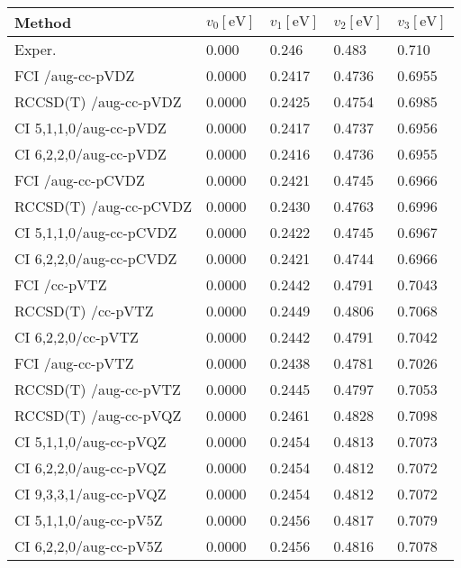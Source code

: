 \begin{tabular}{lllll}
\toprule
Method & $v_0 [\mathrm{eV}]$ & $v_1 [\mathrm{eV}]$ & $v_2 [\mathrm{eV}]$ & $v_3[\mathrm{eV}]$ \\ \midrule
    Exper. & 0.000 & 0.246 & 0.483 & 0.710 \\
\midrule
FCI /aug-cc-pVDZ & 0.0000 & 0.2417 & 0.4736 & 0.6955\\
RCCSD(T) /aug-cc-pVDZ & 0.0000 & 0.2425 & 0.4754 & 0.6985\\
CI 5,1,1,0/aug-cc-pVDZ & 0.0000 & 0.2417 & 0.4737 & 0.6956\\
CI 6,2,2,0/aug-cc-pVDZ & 0.0000 & 0.2416 & 0.4736 & 0.6955\\
FCI /aug-cc-pCVDZ & 0.0000 & 0.2421 & 0.4745 & 0.6966\\
RCCSD(T) /aug-cc-pCVDZ & 0.0000 & 0.2430 & 0.4763 & 0.6996\\
CI 5,1,1,0/aug-cc-pCVDZ & 0.0000 & 0.2422 & 0.4745 & 0.6967\\
CI 6,2,2,0/aug-cc-pCVDZ & 0.0000 & 0.2421 & 0.4744 & 0.6966\\
FCI /cc-pVTZ & 0.0000 & 0.2442 & 0.4791 & 0.7043\\
RCCSD(T) /cc-pVTZ & 0.0000 & 0.2449 & 0.4806 & 0.7068\\
CI 6,2,2,0/cc-pVTZ & 0.0000 & 0.2442 & 0.4791 & 0.7042\\
FCI /aug-cc-pVTZ & 0.0000 & 0.2438 & 0.4781 & 0.7026\\
RCCSD(T) /aug-cc-pVTZ & 0.0000 & 0.2445 & 0.4797 & 0.7053\\
RCCSD(T) /aug-cc-pVQZ & 0.0000 & 0.2461 & 0.4828 & 0.7098\\
CI 5,1,1,0/aug-cc-pVQZ & 0.0000 & 0.2454 & 0.4813 & 0.7073\\
CI 6,2,2,0/aug-cc-pVQZ & 0.0000 & 0.2454 & 0.4812 & 0.7072\\
CI 9,3,3,1/aug-cc-pVQZ & 0.0000 & 0.2454 & 0.4812 & 0.7072\\
CI 5,1,1,0/aug-cc-pV5Z & 0.0000 & 0.2456 & 0.4817 & 0.7079\\
CI 6,2,2,0/aug-cc-pV5Z & 0.0000 & 0.2456 & 0.4816 & 0.7078\\
\bottomrule
\end{tabular}

